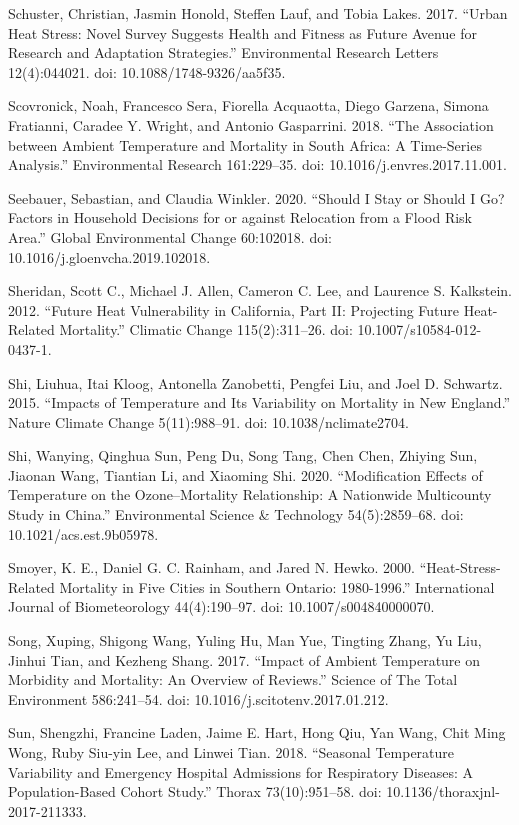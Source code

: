 \documentclass[12pt]{article}
\begin{document}
Schuster, Christian, Jasmin Honold, Steffen Lauf, and Tobia Lakes. 2017.
``Urban Heat Stress: Novel Survey Suggests Health and Fitness as Future
Avenue for Research and Adaptation Strategies.'' Environmental Research
Letters 12(4):044021. doi: 10.1088/1748-9326/aa5f35.

Scovronick, Noah, Francesco Sera, Fiorella Acquaotta, Diego Garzena,
Simona Fratianni, Caradee Y. Wright, and Antonio Gasparrini. 2018. ``The
Association between Ambient Temperature and Mortality in South Africa: A
Time-Series Analysis.'' Environmental Research 161:229--35. doi:
10.1016/j.envres.2017.11.001.

Seebauer, Sebastian, and Claudia Winkler. 2020. ``Should I Stay or
Should I Go? Factors in Household Decisions for or against Relocation
from a Flood Risk Area.'' Global Environmental Change 60:102018. doi:
10.1016/j.gloenvcha.2019.102018.

Sheridan, Scott C., Michael J. Allen, Cameron C. Lee, and Laurence S.
Kalkstein. 2012. ``Future Heat Vulnerability in California, Part II:
Projecting Future Heat-Related Mortality.'' Climatic Change
115(2):311--26. doi: 10.1007/s10584-012-0437-1.

Shi, Liuhua, Itai Kloog, Antonella Zanobetti, Pengfei Liu, and Joel D.
Schwartz. 2015. ``Impacts of Temperature and Its Variability on
Mortality in New England.'' Nature Climate Change 5(11):988--91. doi:
10.1038/nclimate2704.

Shi, Wanying, Qinghua Sun, Peng Du, Song Tang, Chen Chen, Zhiying Sun,
Jiaonan Wang, Tiantian Li, and Xiaoming Shi. 2020. ``Modification
Effects of Temperature on the Ozone--Mortality Relationship: A
Nationwide Multicounty Study in China.'' Environmental Science \&
Technology 54(5):2859--68. doi: 10.1021/acs.est.9b05978.

Smoyer, K. E., Daniel G. C. Rainham, and Jared N. Hewko. 2000.
``Heat-Stress-Related Mortality in Five Cities in Southern Ontario:
1980-1996.'' International Journal of Biometeorology 44(4):190--97. doi:
10.1007/s004840000070.

Song, Xuping, Shigong Wang, Yuling Hu, Man Yue, Tingting Zhang, Yu Liu,
Jinhui Tian, and Kezheng Shang. 2017. ``Impact of Ambient Temperature on
Morbidity and Mortality: An Overview of Reviews.'' Science of The Total
Environment 586:241--54. doi: 10.1016/j.scitotenv.2017.01.212.

Sun, Shengzhi, Francine Laden, Jaime E. Hart, Hong Qiu, Yan Wang, Chit
Ming Wong, Ruby Siu-yin Lee, and Linwei Tian. 2018. ``Seasonal
Temperature Variability and Emergency Hospital Admissions for
Respiratory Diseases: A Population-Based Cohort Study.'' Thorax
73(10):951--58. doi: 10.1136/thoraxjnl-2017-211333.
\end{document}
